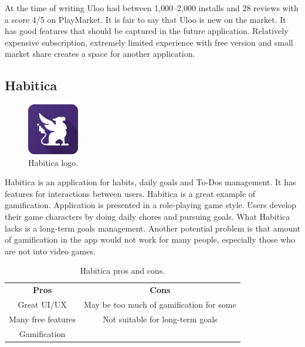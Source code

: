 At the time of writing Uloo had between 1,000--2,000 installs and 28 reviews with a score 4/5 on PlayMarket.
It is fair to say that Uloo is new on the market.
It has good features that should be captured in the future application.
Relatively expensive subscription, extremely limited experience with free version and small market share creates a space for another application.


\subsection{Habitica}\label{subsec:habitica}

\begin{figure}[h!]
    \includegraphics[width=0.20\textwidth]{images/habitica-logo.png}
    \caption{Habitica logo.\cite{habitica-logo}}
    \label{fig:habitica-logo}
\end{figure}

Habitica is an application for habits, daily goals and To-Dos management.
It has features for interactions between users.
Habitica is a great example of gamification.
Application is presented in a role-playing game style.
Users develop their game characters by doing daily chores and pursuing goals.
What Habitica lacks is a long-term goals management.
Another potential problem is that amount of gamification in the app would not work for many people,
especially those who are not into video games.

\begin{table}[h!]
    \centering
    \begin{ctucolortab}
        \begin{tabular}{cc}
            \bfseries Pros & \bfseries Cons\\\Midrule
            Great UI/UX & May be too much of gamification for some\\
            Many free features & Not suitable for long-term goals\\
            Gamification & \\
        \end{tabular}
    \end{ctucolortab}
    \caption{Habitica pros and cons.}\label{tab:habitica-pros-cons}
\end{table}

